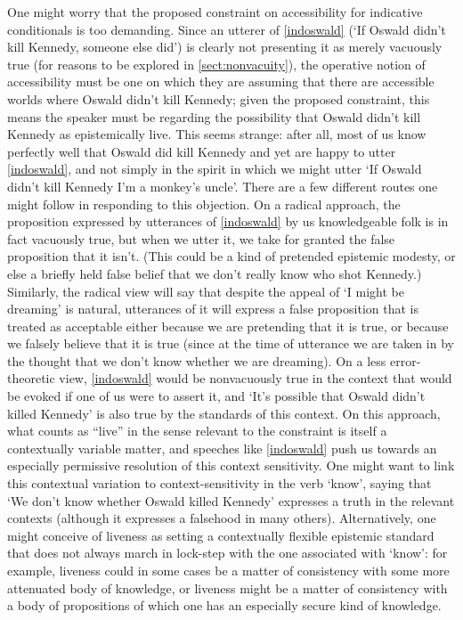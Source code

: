\documentclass[If.tex]{subfiles}
\begin{document}
One might worry that the proposed constraint on accessibility for indicative conditionals is too demanding.  Since an utterer of \ref{indoswald} (‘If Oswald didn't kill Kennedy, someone else did’) is clearly not presenting it as merely vacuously true (for reasons to be explored in  \autoref{sect:nonvacuity}), the operative notion of accessibility must be one on which they are assuming that there are accessible worlds where Oswald didn't kill Kennedy; given the proposed constraint, this means the speaker must be regarding the possibility that Oswald didn't kill Kennedy as epistemically live.  This seems strange: after all, most of us know perfectly well that Oswald did kill Kennedy and yet are happy to utter \ref{indoswald}, and not simply in the spirit in which we might utter ‘If Oswald didn't kill Kennedy I'm a monkey's uncle’. There are a few different routes one might follow in responding to this objection. On a radical approach, the proposition expressed by utterances of \ref{indoswald} by us knowledgeable folk is in fact vacuously true, but when we utter it, we take for granted the false proposition that it isn't.  (This could be a kind of pretended epistemic modesty, or else a briefly held false belief that we don't really know who shot Kennedy.)  Similarly, the radical view will say that despite the appeal of ‘I might be dreaming’ is natural, utterances of it will express a false proposition that is treated as acceptable either because we are pretending that it is true, or because we falsely believe that it is true (since at the time of utterance we are taken in by the thought that we don't know whether we are dreaming). On a less error-theoretic view, \ref{indoswald} would be nonvacuously true in the context that would be evoked if one of us were to assert it, and ‘It's possible that Oswald didn't killed Kennedy’ is also true by the standards of this context.  On this approach, what counts as “live” in the sense relevant to the constraint is itself a contextually variable matter, and speeches like \ref{indoswald} push us towards an especially permissive resolution of this context sensitivity.  One might want to link this contextual variation to context-sensitivity in the verb ‘know’, saying that ‘We don't know whether Oswald killed Kennedy’ expresses a truth in the relevant contexts (although it expresses a falsehood in many others).  Alternatively, one might conceive of liveness as setting a contextually flexible epistemic standard that does not always march in lock-step with the one associated with ‘know’: for example, liveness could in some cases be a matter of consistency with some more attenuated body of knowledge, or liveness might be a matter of consistency with a body of propositions of which one has an especially secure kind of knowledge.
\end{document}
